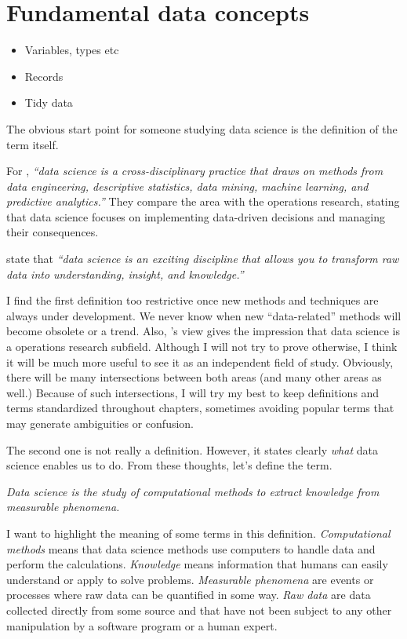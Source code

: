 \chapter{Fundamental data concepts}

\begin{itemize}
  \item Variables, types etc
  \item Records
  \item Tidy data
\end{itemize}

The obvious start point for someone studying data science is the definition of the term
itself.

For \textcite{Zumel2019}, \emph{``data science is a cross-disciplinary practice that draws
on methods from data engineering, descriptive statistics, data mining, machine learning,
and predictive analytics.''}  They compare the area with the operations research, stating
that data science focuses on implementing data-driven decisions and managing their
consequences.

\textcite{Hickham2023} state that \emph{``data science is an exciting discipline that
allows you to transform raw data into understanding, insight, and knowledge.''}

I find the first definition too restrictive once new methods and techniques are always
under development.  We never know when new ``data-related'' methods will become obsolete
or a trend.  Also, \textcite{Zumel2019}'s view gives the impression that data science is a
operations research subfield.  Although I will not try to prove otherwise, I think it will
be much more useful to see it as an independent field of study.  Obviously, there will be
many intersections between both areas (and many other areas as well.)  Because of such
intersections, I will try my best to keep definitions and
terms standardized throughout chapters, sometimes avoiding popular terms that may generate
ambiguities or confusion.

The second one is not really a definition.  However, it states clearly \emph{what} data
science enables us to do.  From these thoughts, let's define the term.

\begin{displayquote}
  \em
  Data science is the study of computational methods to extract knowledge from
  measurable phenomena.
\end{displayquote}

I want to highlight the meaning of some terms in this definition.  \emph{Computational methods} means
that data science methods use computers to handle data and perform the calculations.
\emph{Knowledge} means information that humans can easily understand or apply to solve
problems.  \emph{Measurable phenomena} are events or processes where raw data can be
quantified in some way.  \emph{Raw data} are data collected directly from some source and
that have not been subject to any other manipulation by a software program or a human
expert.

